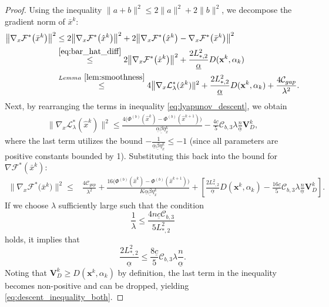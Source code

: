 \documentclass{article}
\theoremstyle{plain}
\theoremstyle{definition}
\theoremstyle{remark}
\begin{document}
\begin{proof}
    Using the inequality $\|a+b\|^2 \leq 2\|a\|^2 + 2\|b\|^2$, we decompose the gradient norm of $\bar{x}^k$:
    \begin{align}\label{stmeasure_bound}
        \big\|\nabla_{x} \mathcal{F}^{*}\big({\bar{x}}^k\big) \big\|^{2} 
        &\leq 2\big\|\nabla_{x} \mathcal{F}^{*}\big({\hat{x}}^k\big) \big\|^{2} + 2\big\|\nabla_{x} \mathcal{F}^{*}\big({\hat{x}}^k\big)- \nabla_{x} \mathcal{F}^{*}\big({\bar{x}}^k\big) \big\|^{2} \notag\\
        &\overset{\eqref{eq:bar_hat_diff}}{\leq} 2\big\|\nabla_{x} \mathcal{F}^{*}\big({\hat{x}}^k\big) \big\|^{2} + \frac{2 L_{*,2}^{2}}{\underline{\alpha}}  D(\mathbf{x}^{k},\alpha_{k})\notag\\
         &\overset{Lemma~ \ref{lem:smoothness}}{\leq} 4\big\|\nabla_{x}\mathcal{L}_{\lambda}^*({\hat{x}}^k)\|^{2}  + \frac{2 L_{*,2}^{2}}{\underline{\alpha}}  D(\mathbf{x}^{k},\alpha_{k})+\frac{4\mathcal{C}_{gap}}{\lambda^{2}}.
    \end{align}
   Next, by rearranging the terms in inequality \eqref{eq:lyapunov_descent}, we obtain
    \begin{align*}
        \big\|\nabla_{x}\mathcal{L}_{\lambda}^*({\hat{x}}^k) \big\|^{2} 
        \leq  \frac{4\big(\Phi^{(b)}({\hat{x}}^{k}) - \Phi^{(b)}({\hat{x}}^{k+1}) \big)}{\underline{\alpha}\underline{\beta}\eta_{x}^{k}} - \frac{4\underline{c}}{5}\mathcal{C}_{b,3}\lambda \frac{n}{\underline{\alpha}}  \mathbf{V}_{D}^{k},
    \end{align*}
where the last term utilizes the bound $-\frac{1}{\underline{\alpha}\underline{\beta}\eta_{x}^{k}}\leq-1$ (since all parameters are positive constants bounded by 1).
    Substituting this back into the bound for $\nabla \mathcal{F}^*(\bar{x}^k)$:
    \begin{align}\label{eq:sum_descent_1}
        \big\|\nabla_{x} \mathcal{F}^{*}\big({\bar{x}}^k\big) \big\|^{2} 
        \leq{}& \frac{4\mathcal{C}_{gap}}{\lambda^{2}} + \frac{16\big(\Phi^{(b)}({\hat{x}}^{k}) - \Phi^{(b)}({\hat{x}}^{k+1}) \big)}{K \underline{\alpha}\underline{\beta}\eta_{x}^{k}} + \left[ \frac{2 L_{*,2}^{2}}{\underline{\alpha}} D(\mathbf{x}^{k},\alpha_{k}) - \frac{16\underline{c}}{5}\mathcal{C}_{b,3}\lambda \frac{n}{\underline{\alpha}} \mathbf{V}_{D}^{k} \right].
    \end{align}
If we choose $\lambda$ sufficiently large such that the condition
\[
    \frac{1}{\lambda} \leq \frac{4 n\underline{c}\mathcal{C}_{b,3}}{5  L_{*,2}^{2}}
\]
holds, it implies that
\[
    \frac{2 L_{*,2}^{2}}{\underline{\alpha}} \leq \frac{8\underline{c}}{5}\mathcal{C}_{b,3} \lambda \frac{n}{\underline{\alpha}}.
\]
Noting that $\mathbf{V}_{D}^{k} \geq D(\mathbf{x}^{k},\alpha_{k})$ by definition, the last term in the inequality becomes non-positive and can be dropped, yielding \eqref{eq:descent_inequality_both}.


\end{proof}
\end{document}
